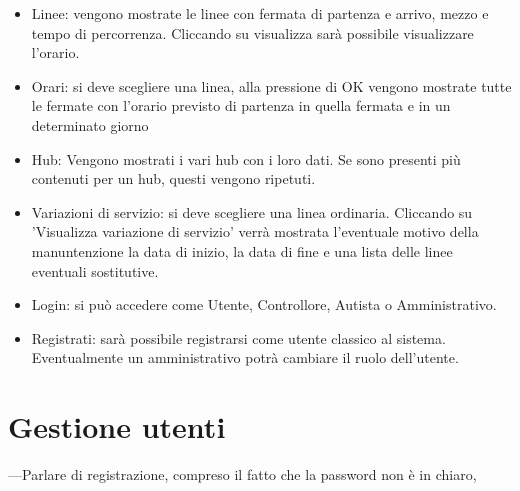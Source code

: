 \documentclass[12pt,a4paper]{report}
\begin{document}
\begin{itemize}
    \item Linee: vengono mostrate le linee  con fermata di partenza e arrivo, mezzo e tempo di percorrenza. Cliccando su visualizza sarà possibile visualizzare l'orario.
    \item Orari: si deve scegliere una linea, alla pressione di OK vengono mostrate tutte le fermate con l'orario previsto di partenza in quella fermata e in un determinato giorno
    \item Hub: Vengono mostrati i vari hub con i loro dati. Se sono presenti più contenuti per un hub, questi vengono ripetuti.
    \item Variazioni di servizio: si deve scegliere una linea ordinaria. Cliccando su 'Visualizza variazione di servizio' verrà mostrata l'eventuale motivo della manuntenzione la data di inizio, la data di fine e una lista delle linee eventuali sostitutive.
    \item Login: si può accedere come Utente, Controllore, Autista o Amministrativo.
    \item Registrati: sarà possibile registrarsi come utente classico al sistema. Eventualmente un amministrativo potrà cambiare il ruolo dell'utente.
\end{itemize}


\section{Gestione utenti}
---Parlare di registrazione, compreso il fatto che la password non è  in chiaro,
\end{document}
